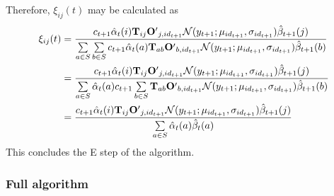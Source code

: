 \documentclass[12pt,a4paper,twoside,openright]{report}
\begin{document}
\noindent Therefore, $\xi_{ij}(t)$ may be calculated as
\[\begin{aligned}
\xi_{ij}(t) &= \frac{c_{t+1}\hat{\alpha}_t(i){\bf T}_{ij}{\bf O'}_{j,id_{t+1}}\mathcal{N}(y_{t+1}; \mu_{id_{t+1}}, \sigma_{id_{t+1}})\hat{\beta}_{t+1}(j)}{\sum\limits_{a\in S}\sum\limits_{b\in S}c_{t+1}\hat{\alpha}_t(a){\bf T}_{ab}{\bf O'}_{b,id_{t+1}}\mathcal{N}(y_{t+1}; \mu_{id_{t+1}}, \sigma_{id_{t+1}})\hat{\beta}_{t+1}(b)}\\
&= \frac{c_{t+1}\hat{\alpha}_t(i){\bf T}_{ij}{\bf O'}_{j,id_{t+1}}\mathcal{N}(y_{t+1}; \mu_{id_{t+1}}, \sigma_{id_{t+1}})\hat{\beta}_{t+1}(j)}{\sum\limits_{a\in S}\hat{\alpha}_t(a)c_{t+1}\sum\limits_{b\in S}{\bf T}_{ab}{\bf O'}_{b,id_{t+1}}\mathcal{N}(y_{t+1}; \mu_{id_{t+1}}, \sigma_{id_{t+1}})\hat{\beta}_{t+1}(b)}\\
&= \frac{c_{t+1}\hat{\alpha}_t(i){\bf T}_{ij}{\bf O'}_{j,id_{t+1}}\mathcal{N}(y_{t+1}; \mu_{id_{t+1}}, \sigma_{id_{t+1}})\hat{\beta}_{t+1}(j)}{\sum\limits_{a\in S}\hat{\alpha}_t(a)\hat{\beta}_{t}(a)}
\end{aligned}\]
This concludes the E step of the algorithm.

\subsubsection{Full algorithm}
\end{document}
